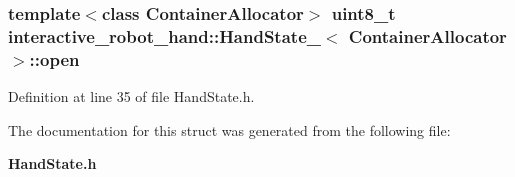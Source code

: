 \subsubsection[{open}]{\setlength{\rightskip}{0pt plus 5cm}template$<$class Container\-Allocator$>$ uint8\-\_\-t {\bf interactive\-\_\-robot\-\_\-hand\-::\-Hand\-State\-\_\-}$<$ Container\-Allocator $>$\-::open}\label{structinteractive__robot__hand_1_1HandState___aec07238f62b4ce2d279c36693c93d3b7}


Definition at line 35 of file Hand\-State.\-h.



The documentation for this struct was generated from the following file\-:\begin{DoxyCompactItemize}
\item 
{\bf Hand\-State.\-h}\end{DoxyCompactItemize}
